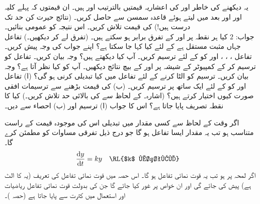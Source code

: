 یہ دیکھنے کی خاطر  اور  کی  اعشاریہ قیمتیں بالترتیب  اور  ہیں۔ ان قیمتوں کہ پہلے کلیہ  اور اور بعد میں  لیتے ہوئے قاعدہ سمسن سے حاصل کریں۔ (نتائج حیرت کن حد تک درست ہیں!)
 کی قیمت تلاش کریں۔ اس نتیجہ کو عمومی بنائیں۔\\
جواب:\quad
$2$
کیا ہر نقطہ پر  اور  کے تفرق برابر ہو سکتے ہیں۔ (تفرق لے کر دیکھیں۔) تفاعل  جہاں  مثبت مستقل ہے کے لئے کیا کہا جا سکتا ہے؟ اپنے جواب کی وجہ پیش کریں۔
تفاعل ، ، ،  اور  کو  کے لئے ترسیم کریں۔ آپ کیا دیکھتے ہیں؟ وجہ بیان کریں۔
تفاعل  کو ترسیم کر کے کمپیوٹر کے شیشہ پر   اور  کے بیچ نتائج  دیکھیں۔ آپ کو کیا نظر آتا ہے؟ وجہ بیان کریں۔  ترسیم کو الٹا کرنے کے لئے تفاعل میں کیا تبدیلی کرنی ہو گی؟
(ا) تفاعل  اور  کو  کے لئے ایک ساتھ  پر ترسیم کریں۔  (ب)  کی قیمت بڑھنے سے ترسیمات افقی صورت کیوں اختیار کرتے ہیں؟ (اشارہ۔  کے لحاظ سے  کی بالائی حد تلاش کریں۔)
کیا  کا نقطہ تصریف پایا جاتا ہے؟ اس کا جواب (ا) ترسیم اور (ب) احصاء سے دیں۔

اگر وقت کے لحاظ سے کسی مقدار  میں تبدیلی اس کی موجودہ قیمت    کے راست متناسب ہو تب یہ مقدار ایسا تفاعل ہو گا جو درج ذیل تفرقی مساوات کو مطمئن کرے گا۔
\begin{align*}
\frac{\dif y}{\dif t}&=k y&&\text{\RL{$k$ مستقل}}
\end{align*} 
اگر لمحہ  پر  ہو تب یہ قوت نمائی تفاعل  ہو گا۔  اس حصہ میں قوت نمائی تفاعل کی تعریف (یہ  کا الٹ ہے) پیش کی جائے گی اور ان خواص پر غور کیا جائے گا جن کی بدولت قوت نمائی تفاعل ریاضیات اور استعمال میں کثرت سے پایا جاتا ہے (حصہ )۔

